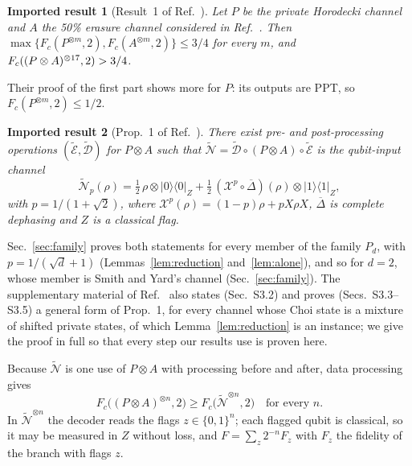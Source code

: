\documentclass[aps,pra,twocolumn,superscriptaddress,nofootinbib,longbibliography,floatfix]{revtex4-2}
\newtheorem{imported}{Imported result}
\newcommand{\proj}[1]{|#1\rangle\langle #1|}
\newcommand{\nt}{\widetilde{\mathcal N}}
\newcommand{\deph}{\overline{\varDelta}}
\begin{document}
\begin{imported}[Result~1 of Ref.~\cite{parentin2026onset}]
\label{imp:result1}
Let $P$ be the private Horodecki channel and $A$ the 50\% erasure channel considered in Ref.~\cite{smith2008quantum}. Then $\max\{F_c(P^{\otimes m},2),F_c(A^{\otimes m},2)\}\le3/4$ for every $m$, and $F_c((P\otimes A)^{\otimes17},2)>3/4$.
\end{imported}
\noindent Their proof of the first part shows more for $P$: its outputs are PPT, so $F_c(P^{\otimes m},2)\le1/2$.

\begin{imported}[Prop.~1 of Ref.~\cite{parentin2026onset}]
\label{imp:prop1}
There exist pre- and post-processing operations $(\widetilde{\mathcal E},\widetilde{\mathcal D})$ for $P\otimes A$ such that $\nt=\widetilde{\mathcal D}\circ(P\otimes A)\circ\widetilde{\mathcal E}$ is the qubit-input channel
\begin{equation}
\label{eq:nt}
\nt_p(\rho)=\tfrac12\,\rho\otimes\proj0_Z+\tfrac12\,(\mathcal X^p\circ\deph)(\rho)\otimes\proj1_Z,
\end{equation}
with $p=1/(1+\sqrt2)$, where $\mathcal X^p(\rho)=(1-p)\rho+pX\rho X$, $\deph$ is complete dephasing and $Z$ is a classical flag.
\end{imported}
\noindent Sec.~\ref{sec:family} proves both statements for every member of the family $P_d$, with $p=1/(\sqrt d+1)$ (Lemmas~\ref{lem:reduction} and~\ref{lem:alone}), and so for $d=2$, whose member is Smith and Yard's channel (Sec.~\ref{sec:family}). The supplementary material of Ref.~\cite{parentin2026onset} also states (Sec.~S3.2) and proves (Secs.~S3.3--S3.5) a general form of Prop.~1, for every channel whose Choi state is a mixture of shifted private states, of which Lemma~\ref{lem:reduction} is an instance; we give the proof in full so that every step our results use is proven here.

Because $\nt$ is one use of $P\otimes A$ with processing before and after, data processing gives
\begin{equation}
\label{eq:dp}
F_c\bigl((P\otimes A)^{\otimes n},2\bigr)\ge F_c\bigl(\nt^{\otimes n},2\bigr)\quad\text{for every }n.
\end{equation}
In $\nt^{\otimes n}$ the decoder reads the flags $z\in\{0,1\}^n$; each flagged qubit is classical, so it may be measured in $Z$ without loss, and $F=\sum_z2^{-n}F_z$ with $F_z$ the fidelity of the branch with flags $z$.

\end{document}
